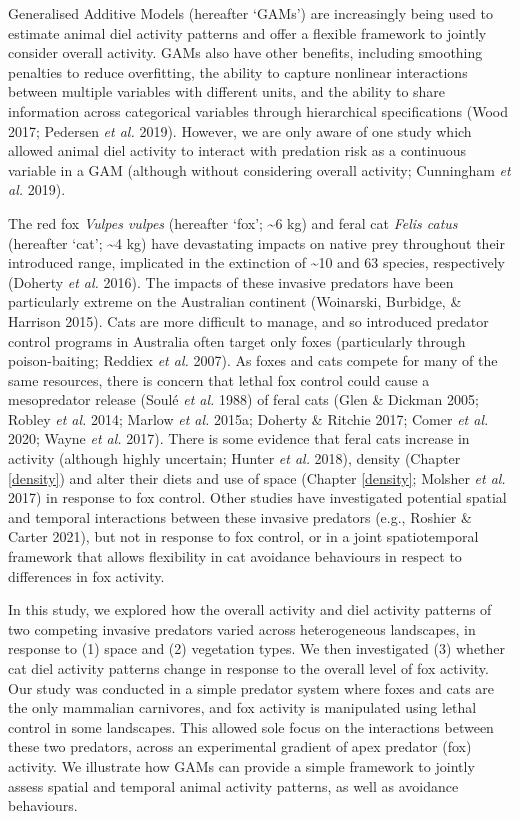 \documentclass[11pt,a4paper,titlepage,twoside,openright]{style/unimelbthesis}
\begin{document}
\begin{mainmatter}
Generalised Additive Models (hereafter `GAMs') are increasingly being used to estimate animal diel activity patterns and offer a flexible framework to jointly consider overall activity. GAMs also have other benefits, including smoothing penalties to reduce overfitting, the ability to capture nonlinear interactions between multiple variables with different units, and the ability to share information across categorical variables through hierarchical specifications (Wood 2017; Pedersen \emph{et al.} 2019). However, we are only aware of one study which allowed animal diel activity to interact with predation risk as a continuous variable in a GAM (although without considering overall activity; Cunningham \emph{et al.} 2019).

The red fox \emph{Vulpes vulpes} (hereafter `fox'; \textasciitilde6 kg) and feral cat \emph{Felis catus} (hereafter `cat'; \textasciitilde4 kg) have devastating impacts on native prey throughout their introduced range, implicated in the extinction of \textasciitilde10 and 63 species, respectively (Doherty \emph{et al.} 2016). The impacts of these invasive predators have been particularly extreme on the Australian continent (Woinarski, Burbidge, \& Harrison 2015). Cats are more difficult to manage, and so introduced predator control programs in Australia often target only foxes (particularly through poison-baiting; Reddiex \emph{et al.} 2007). As foxes and cats compete for many of the same resources, there is concern that lethal fox control could cause a mesopredator release (Soulé \emph{et al.} 1988) of feral cats (Glen \& Dickman 2005; Robley \emph{et al.} 2014; Marlow \emph{et al.} 2015a; Doherty \& Ritchie 2017; Comer \emph{et al.} 2020; Wayne \emph{et al.} 2017). There is some evidence that feral cats increase in activity (although highly uncertain; Hunter \emph{et al.} 2018), density (Chapter \ref{density}) and alter their diets and use of space (Chapter \ref{density}; Molsher \emph{et al.} 2017) in response to fox control. Other studies have investigated potential spatial and temporal interactions between these invasive predators (e.g., Roshier \& Carter 2021), but not in response to fox control, or in a joint spatiotemporal framework that allows flexibility in cat avoidance behaviours in respect to differences in fox activity.

In this study, we explored how the overall activity and diel activity patterns of two competing invasive predators varied across heterogeneous landscapes, in response to (1) space and (2) vegetation types. We then investigated (3) whether cat diel activity patterns change in response to the overall level of fox activity. Our study was conducted in a simple predator system where foxes and cats are the only mammalian carnivores, and fox activity is manipulated using lethal control in some landscapes. This allowed sole focus on the interactions between these two predators, across an experimental gradient of apex predator (fox) activity. We illustrate how GAMs can provide a simple framework to jointly assess spatial and temporal animal activity patterns, as well as avoidance behaviours.


\end{mainmatter}
\end{document}

